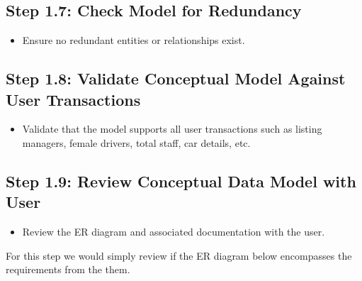 \documentclass[a4paper,12pt]{article}
\begin{document}
\subsection*{Step 1.7: Check Model for Redundancy}
\begin{itemize}
    \item Ensure no redundant entities or relationships exist.
\end{itemize}

\subsection*{Step 1.8: Validate Conceptual Model Against User Transactions}
\begin{itemize}
    \item Validate that the model supports all user transactions such as listing managers, female drivers, total staff, car details, etc.
\end{itemize}

\subsection*{Step 1.9: Review Conceptual Data Model with User}
\begin{itemize}
    \item Review the ER diagram and associated documentation with the user.
\end{itemize}
For this step we would simply review if the ER diagram below encompasses the requirements from the them. 
\end{document}
